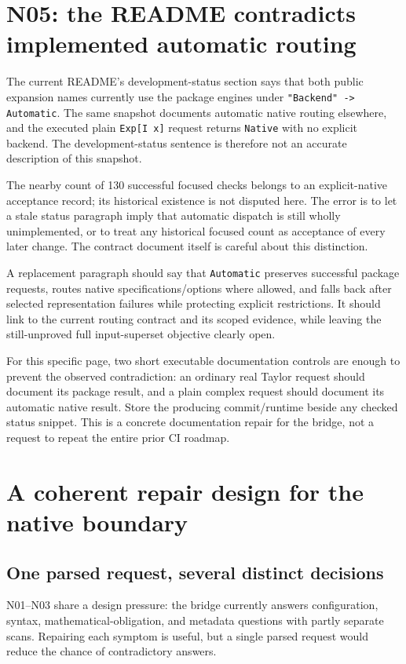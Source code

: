 \documentclass[11pt]{article}
\newcommand{\code}[1]{\texttt{#1}}
\begin{document}
\section{N05: the README contradicts implemented automatic routing}
The current README's development-status section says that both public expansion names currently use the package engines under \code{"Backend" -> Automatic}. The same snapshot documents automatic native routing elsewhere, and the executed plain \code{Exp[I x]} request returns \code{Native} with no explicit backend. The development-status sentence is therefore not an accurate description of this snapshot.\cite{readme,contracts}

The nearby count of 130 successful focused checks belongs to an explicit-native acceptance record; its historical existence is not disputed here. The error is to let a stale status paragraph imply that automatic dispatch is still wholly unimplemented, or to treat any historical focused count as acceptance of every later change. The contract document itself is careful about this distinction.\cite{contracts}

A replacement paragraph should say that \code{Automatic} preserves successful package requests, routes native specifications/options where allowed, and falls back after selected representation failures while protecting explicit restrictions. It should link to the current routing contract and its scoped evidence, while leaving the still-unproved full input-superset objective clearly open.

For this specific page, two short executable documentation controls are enough to prevent the observed contradiction: an ordinary real Taylor request should document its package result, and a plain complex request should document its automatic native result. Store the producing commit/runtime beside any checked status snippet. This is a concrete documentation repair for the bridge, not a request to repeat the entire prior CI roadmap.

\section{A coherent repair design for the native boundary}
\label{sec:design}
\subsection{One parsed request, several distinct decisions}
N01--N03 share a design pressure: the bridge currently answers configuration, syntax, mathematical-obligation, and metadata questions with partly separate scans. Repairing each symptom is useful, but a single parsed request would reduce the chance of contradictory answers.
\end{document}

